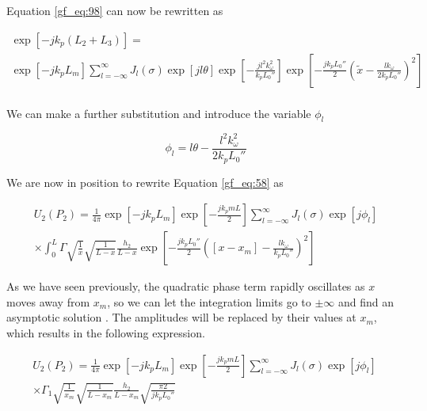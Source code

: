 \noindent Equation \ref{gf_eq:98} can now be rewritten as

\begin{equation}
\begin{gathered}
\exp\left[-jk_p\left( L_2 + L_3\right) \right]= \\
\exp\left[-jk_pL_m\right]\sum_{l=-\infty}^{\infty}J_l(\sigma)\exp\left[jl\theta\right]
\exp\left[- \frac{jl^2k_{\omega}^2}{k_pL_0''} \right]\exp\left[-\frac{jk_pL_0''}{2}\left(\tilde{x}-\frac{lk_{\omega}}{2k_pL_0''} \right)^2\right]\\
\label{gf_eq:100}
\end{gathered}
\end{equation}
\renewcommand{\baselinestretch}{2} \small\normalsize

\noindent We can make a further substitution and introduce the variable $\phi_l$

\begin{equation}
\phi_l = l\theta - \frac{l^2k_{\omega}^2}{2k_pL_0''}
\label{gf_eq:101}
\end{equation}
\renewcommand{\baselinestretch}{2} \small\normalsize

\noindent We are now in position to rewrite Equation \ref{gf_eq:58} as

\begin{equation}
\begin{gathered}
U_2(P_2) = \frac{1}{4\pi} \exp[-jk_pL_m] \exp\left[-\frac{jk_pmL}{2}\right]\sum_{l=-\infty}^{\infty}J_l(\sigma)\exp\left[j\phi_l\right] \\
\times \int_0^L  \Gamma \sqrt{\frac{1}{x}}\sqrt{\frac{1}{L-x}}\frac{h_2}{L-x}\exp\left[-\frac{jk_pL_0''}{2}\left([x-x_m]-\frac{lk_{\omega}}{k_pL_0''} \right)^2\right]
\label{gf_eq:102}
\end{gathered}
\end{equation}
\renewcommand{\baselinestretch}{2} \small\normalsize

As we have seen previously, the quadratic phase term rapidly oscillates as $x$ moves away from $x_m$, so we can let the integration limits go to $\pm \infty$ and find an asymptotic solution \cite{cheng_analytic_methods}. The amplitudes will be replaced by their values at $x_m$, which results in the following expression.

\begin{equation}
\begin{gathered}
U_2(P_2) = \frac{1}{4\pi} \exp[-jk_pL_m] \exp\left[-\frac{jk_pmL}{2}\right] \sum_{l=-\infty}^{\infty}J_l(\sigma)\exp\left[j\phi_l\right]\  \\
\times \Gamma_1 \sqrt{\frac{1}{x_m}}\sqrt{\frac{1}{L-x_m}}\frac{h_2}{L-x_m}\sqrt{\frac{\pi 2}{jk_pL_0''}}
\label{gf_eq:72}
\end{gathered}
\end{equation}
\renewcommand{\baselinestretch}{2} \small\normalsize


